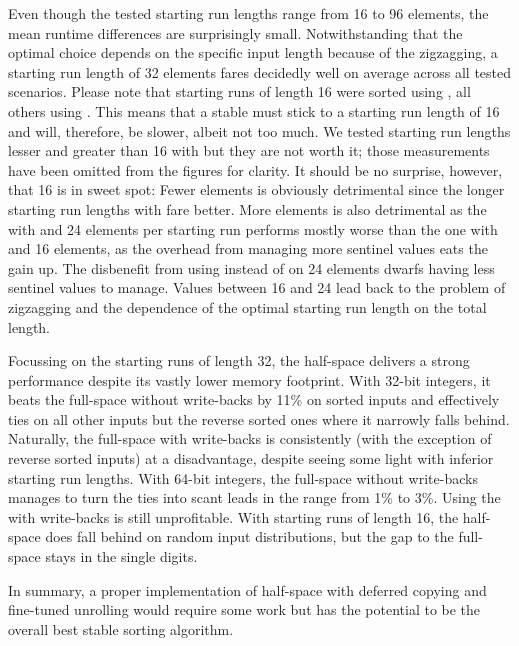Even though the tested starting run lengths range from 16 to 96 elements, the mean runtime differences are surprisingly small.
Notwithstanding that the optimal choice depends on the specific input length because of the zigzagging, a starting run length of 32 elements fares decidedly well on average across all tested scenarios.
Please note that starting runs of length 16 were sorted using \IS{}, all others using \ShS{}.
This means that a stable \MS{} must stick to a starting run length of 16 and will, therefore, be slower, albeit not too much.
We tested starting run lengths lesser and greater than 16 with \IS{} but they are not worth it;
those measurements have been omitted from the figures for clarity.
It should be no surprise, however, that 16 is in sweet spot:
Fewer elements is obviously detrimental since the longer starting run lengths with \ShS{} fare better.
More elements is also detrimental as the \MS{} with \ShS{} and 24 elements per starting run performs mostly worse than the one with \IS{} and 16 elements, as the overhead from managing more sentinel values eats the gain up.
The disbenefit from using \IS{} instead of \ShS{} on 24 elements dwarfs having less sentinel values to manage.
Values between 16 and 24 lead back to the problem of zigzagging and the dependence of the optimal starting run length on the total length.

Focussing on the starting runs of length 32, the half-space \MS{} delivers a strong performance despite its vastly lower memory footprint.
With 32-bit integers, it beats the full-space \MS{} without write-backs by 11\% on sorted inputs and effectively ties on all other inputs but the reverse sorted ones where it narrowly falls behind.
Naturally, the full-space \MS{} with write-backs is consistently (with the exception of reverse sorted inputs) at a disadvantage, despite seeing some light with inferior starting run lengths.
With 64-bit integers, the full-space \MS{} without write-backs manages to turn the ties into scant leads in the range from 1\% to 3\%.
Using the \MS{} with write-backs is still unprofitable.
With starting runs of length 16, the half-space \MS{} does fall behind on random input distributions, but the gap to the full-space \MS{} stays in the single digits.

In summary, a proper implementation of half-space \MS{} with deferred copying and fine-tuned unrolling would require some work but has the potential to be the overall best stable sorting algorithm.
